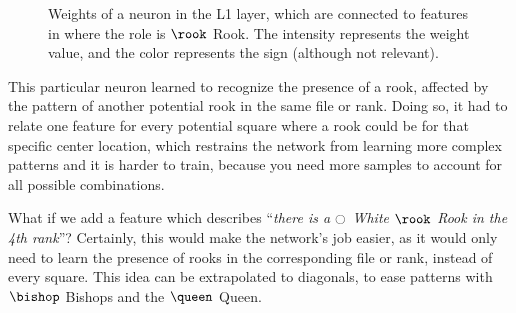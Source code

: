 \begin{figure}[h]
\centering
{}%
\qquad
{}%
\caption{Weights of a neuron in the L1 layer, which are connected to features in  where the role is $\rook$ Rook. The intensity represents the weight value, and the color represents the sign (although not relevant).}
\label{fig:rook_weights}
\end{figure}

This particular neuron learned to recognize the presence of a rook, affected by the pattern of another potential rook in the same file or rank. Doing so, it had to relate one feature for every potential square where a rook could be for that specific center location, which restrains the network from learning more complex patterns and it is harder to train, because you need more samples to account for all possible combinations.

What if we add a feature which describes \enquote{\textit{there is a $\white$ White $\rook$ Rook in the 4th rank}}? Certainly, this would make the network's job easier, as it would only need to learn the presence of rooks in the corresponding file or rank, instead of every square. This idea can be extrapolated to diagonals, to ease patterns with $\bishop$ Bishops and the $\queen$ Queen.

